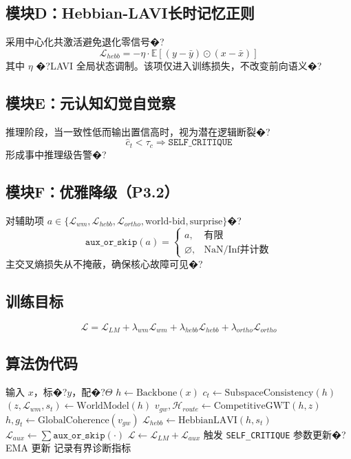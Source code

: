 \documentclass[10pt,twocolumn]{ctexart}
\begin{document}
\subsection{模块D：Hebbian-LAVI长时记忆正则}
采用中心化共激活避免退化零信号�?
\begin{equation}
\mathcal{L}_{hebb} = -\eta\cdot\mathbb{E}[(y-\bar{y})\odot(x-\bar{x})]
\end{equation}
其中 $\eta$ �?LAVI 全局状态调制。该项仅进入训练损失，不改变前向语义�?

\subsection{模块E：元认知幻觉自觉察}
推理阶段，当一致性低而输出置信高时，视为潜在逻辑断裂�?
\begin{equation}
\hat{c}_t<\tau_c\Rightarrow\texttt{SELF\_CRITIQUE}
\end{equation}
形成事中推理级告警�?

\subsection{模块F：优雅降级（P3.2）}
对辅助项 $a\in\{\mathcal{L}_{wm},\mathcal{L}_{hebb},\mathcal{L}_{ortho},\text{world-bid},\text{surprise}\}$�?
\begin{equation}
\texttt{aux\_or\_skip}(a)=
\begin{cases}
a,&\text{有限}\\
\varnothing,&\text{NaN/Inf并计数}
\end{cases}
\end{equation}
主交叉熵损失从不掩蔽，确保核心故障可见�?

\subsection{训练目标}
\begin{equation}
\mathcal{L}=\mathcal{L}_{LM}+\lambda_{wm}\mathcal{L}_{wm}+\lambda_{hebb}\mathcal{L}_{hebb}+\lambda_{ortho}\mathcal{L}_{ortho}
\end{equation}

\subsection{算法伪代码}
\begin{algorithm}[h]
\caption{MT-LNN v2.0 训练/推理步}
\begin{algorithmic}[1]
\Require 输入 $x$，标�?$y$，配�?$\Theta$
\State $h \leftarrow \text{Backbone}(x)$
\State $c_t \leftarrow \text{SubspaceConsistency}(h)$
\State $(z,\mathcal{L}_{wm},s_t) \leftarrow \text{WorldModel}(h)$
\State $v_{gw},\mathcal{H}_{route} \leftarrow \text{CompetitiveGWT}(h,z)$
\State $h,g_t \leftarrow \text{GlobalCoherence}(v_{gw})$ 
\State $\mathcal{L}_{hebb}\leftarrow\text{HebbianLAVI}(h,s_t)$
\State $\mathcal{L}_{aux}\leftarrow\sum \texttt{aux\_or\_skip}(\cdot)$
\State $\mathcal{L}\leftarrow\mathcal{L}_{LM}+\mathcal{L}_{aux}$
  \State 触发 \texttt{SELF\_CRITIQUE}
\EndIf
\State 参数更新�?EMA 更新
\State 记录有界诊断指标
\end{algorithmic}
\end{algorithm}
\end{document}
